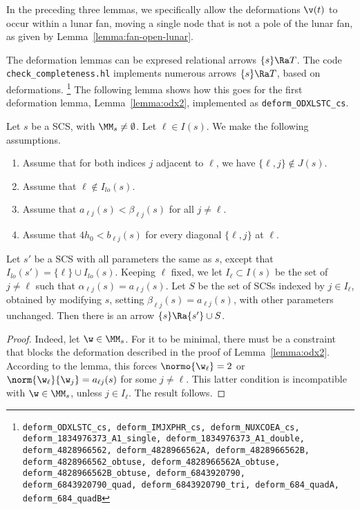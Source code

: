 In the preceding three lemmas, we specifically allow the deformations
$\v(t)$ to occur within a lunar fan, moving a single node that is not a pole
of the lunar fan, as given by Lemma~\ref{lemma:fan-open-lunar}.

The deformation lemmas can be expresed relational
arrows $\{s\}\Ra T$.  The code {\tt check\_completeness.hl} implements
numerous arrows $\{s\}\Ra T$, based on deformations.%
\footnote{\tt deform\_ODXLSTC\_cs,
deform\_IMJXPHR\_cs,
deform\_NUXCOEA\_cs,
deform\_1834976373\_A1\_single,
deform\_1834976373\_A1\_double,
deform\_4828966562,
deform\_4828966562A,
deform\_4828966562B,
deform\_4828966562\_obtuse,
deform\_4828966562A\_obtuse,
deform\_4828966562B\_obtuse,
deform\_6843920790,
deform\_6843920790\_quad,
deform\_6843920790\_tri,
deform\_684\_quadA,
deform\_684\_quadB}
The following lemma shows how this goes
for the first deformation lemma, Lemma~\ref{lemma:odx2}, implemented as
{\tt deform\_ODXLSTC\_cs}.

\begin{lemma}  
Let $s$ be a SCS, with $\MM_s\ne\emptyset$.  Let $\ell\in I(s)$.
We make the following assumptions.
\begin{enumerate}
\item Assume that for both indices $j$ adjacent to $\ell$, we have $\{\ell,j\}\not\in
J(s)$.
\item Assume that $\ell\not\in I_{lo}(s)$.
\item Assume that  $a_{\ell j}(s)<\beta_{\ell j}(s)$ for all $j\ne \ell$.
\item
Assume that $4h_0 < b_{\ell j}(s)$ for every diagonal $\{\ell,j\}$ at
$\ell$.  
\end{enumerate}
Let $s'$ be a SCS with all parameters
the same as $s$, except that $I_{lo}(s') = \{\ell\}\cup I_{lo}(s)$.
Keeping $\ell$ fixed, we
let $I_\ell\subset I(s)$ be the set of $j\ne \ell$ such that 
$\alpha_{\ell j}(s)=a_{\ell j}(s)$. 
Let $S$ be the set of SCSs indexed by $j\in
I_\ell$,
obtained by
modifying $s$, setting $\beta_{\ell j}(s)=a_{\ell j}(s)$, with other
parameters unchanged.
Then there is an arrow $\{s\}\Ra \{s'\}\cup S$.  
\end{lemma}

\begin{proof}
Indeed, let
$\w\in \MM_s$.  For it to be minimal, there must be a constraint
that blocks the  deformation described in the proof of
Lemma~\ref{lemma:odx2}.
According to the lemma, this forces $\normo{\w_\ell}=2$ or
$\norm{\w_\ell}{\w_j}=a_{\ell j}(s)$ for some $j\ne \ell$.  This latter
condition
is incompatible with $\w\in \MM_s$, unless $j\in I_\ell$.  The result
follows.
\end{proof}


